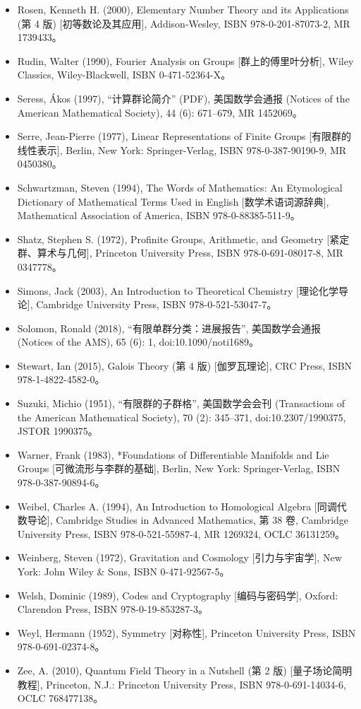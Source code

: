 \begin{itemize}
\item Rosen, Kenneth H. (2000), Elementary Number Theory and its Applications (第 4 版) [初等数论及其应用], Addison-Wesley, ISBN 978-0-201-87073-2, MR 1739433。  
\item Rudin, Walter (1990), Fourier Analysis on Groups [群上的傅里叶分析], Wiley Classics, Wiley-Blackwell, ISBN 0-471-52364-X。  
\item Seress, Ákos (1997), “计算群论简介” (PDF), 美国数学会通报 (Notices of the American Mathematical Society), 44 (6): 671–679, MR 1452069。  
\item Serre, Jean-Pierre (1977), Linear Representations of Finite Groups [有限群的线性表示], Berlin, New York: Springer-Verlag, ISBN 978-0-387-90190-9, MR 0450380。  
\item Schwartzman, Steven (1994), The Words of Mathematics: An Etymological Dictionary of Mathematical Terms Used in English [数学术语词源辞典], Mathematical Association of America, ISBN 978-0-88385-511-9。  
\item Shatz, Stephen S. (1972), Profinite Groups, Arithmetic, and Geometry [紧定群、算术与几何], Princeton University Press, ISBN 978-0-691-08017-8, MR 0347778。  
\item Simons, Jack (2003), An Introduction to Theoretical Chemistry [理论化学导论], Cambridge University Press, ISBN 978-0-521-53047-7。  
\item Solomon, Ronald (2018), “有限单群分类：进展报告”, 美国数学会通报 (Notices of the AMS), 65 (6): 1, doi:10.1090/noti1689。  
\item Stewart, Ian (2015), Galois Theory (第 4 版) [伽罗瓦理论], CRC Press, ISBN 978-1-4822-4582-0。  
\item Suzuki, Michio (1951), “有限群的子群格”, 美国数学会会刊 (Transactions of the American Mathematical Society), 70 (2): 345–371, doi:10.2307/1990375, JSTOR 1990375。  
\item Warner, Frank (1983), *Foundations of Differentiable Manifolds and Lie Groups [可微流形与李群的基础], Berlin, New York: Springer-Verlag, ISBN 978-0-387-90894-6。  
\item Weibel, Charles A. (1994), An Introduction to Homological Algebra [同调代数导论], Cambridge Studies in Advanced Mathematics, 第 38 卷, Cambridge University Press, ISBN 978-0-521-55987-4, MR 1269324, OCLC 36131259。  
\item Weinberg, Steven (1972), Gravitation and Cosmology [引力与宇宙学], New York: John Wiley & Sons, ISBN 0-471-92567-5。  
\item Welsh, Dominic (1989), Codes and Cryptography [编码与密码学], Oxford: Clarendon Press, ISBN 978-0-19-853287-3。  
\item Weyl, Hermann (1952), Symmetry [对称性], Princeton University Press, ISBN 978-0-691-02374-8。  
\item Zee, A. (2010), Quantum Field Theory in a Nutshell (第 2 版) [量子场论简明教程], Princeton, N.J.: Princeton University Press, ISBN 978-0-691-14034-6, OCLC 768477138。  
\end{itemize}
